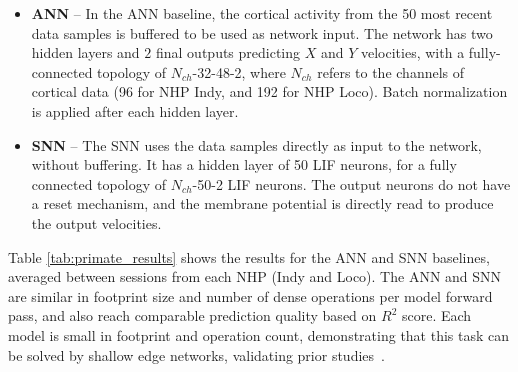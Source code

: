     \begin{itemize}
        \item \textbf{ANN} -- In the ANN baseline, the cortical activity from the 50 most recent data samples is buffered to be used as network input. The network has two hidden layers and $2$ final outputs predicting $X$ and $Y$ velocities, with a fully-connected topology of $N_{ch}$-32-48-2, where $N_{ch}$ refers to the channels of cortical data (96 for NHP Indy, and 192 for NHP Loco). Batch normalization is applied after each hidden layer.
        
        \item \textbf{SNN} -- The SNN uses the data samples directly as input to the network, without buffering. It has a hidden layer of 50 LIF neurons, for a fully connected topology of $N_{ch}$-50-2 LIF neurons. The output neurons do not have a reset mechanism, and the membrane potential is directly read to produce the output velocities. 
        
    \end{itemize}

Table \ref{tab:primate_results} shows the results for the ANN and SNN baselines, averaged between sessions from each NHP (Indy and Loco). The ANN and SNN are similar in footprint size and number of dense operations per model forward pass, and also reach comparable prediction quality based on $R^2$ score. Each model is small in footprint and operation count, demonstrating that this task can be solved by shallow edge networks, validating prior studies~\cite{willsey22realtime}.

